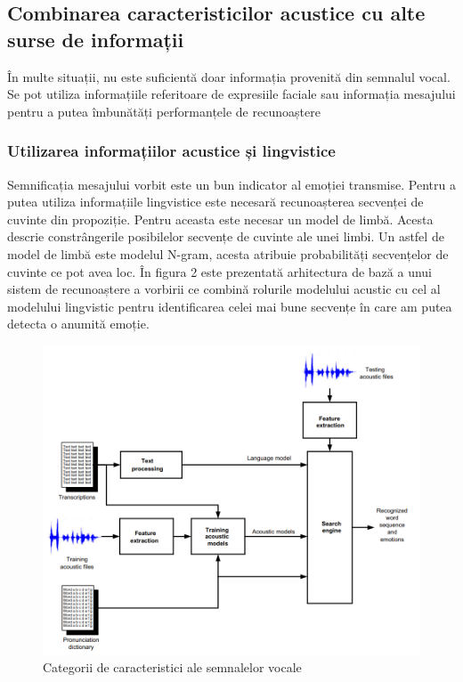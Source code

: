 \documentclass[9pt,shortpaper,twoside,web]{ieeecolor}
\begin{document}
\subsection{Combinarea caracteristicilor acustice cu alte surse de informații}
În multe situații, nu este suficientă doar informația provenită din semnalul vocal. Se pot utiliza informațiile referitoare de expresiile faciale sau informația mesajului pentru a putea îmbunătăți performanțele de recunoaștere


\subsubsection{Utilizarea informațiilor acustice și lingvistice}
Semnificația mesajului vorbit este un bun indicator al emoției transmise. Pentru a putea utiliza informațiile lingvistice este necesară recunoașterea secvenței de cuvinte din propoziție. Pentru aceasta este necesar un model de limbă. Acesta descrie constrângerile posibilelor secvențe de cuvinte ale unei limbi. Un astfel de model de limbă este modelul N-gram, acesta atribuie probabilități secvențelor de cuvinte ce pot avea loc. În figura 2 este prezentată arhitectura de bază a unui sistem de recunoaștere a vorbirii ce combină rolurile modelului acustic cu cel al modelului lingvistic pentru identificarea celei mai bune secvențe în care am putea detecta o anumită emoție.

\begin{figure}[htb]
\includegraphics[width=\columnwidth]{res/fig/arhitectura-modelL-modelA}
\caption{Categorii de caracteristici ale semnalelor vocale}
\label{fig3}
\end{figure}
\end{document}
